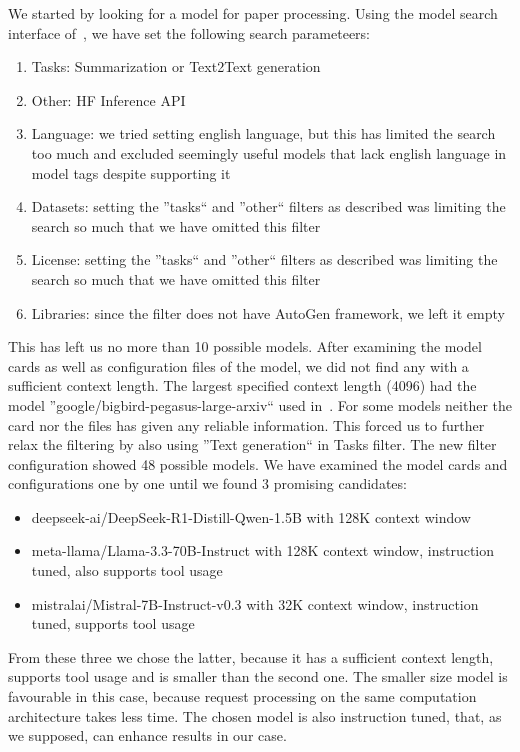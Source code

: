 We started by looking for a model for paper processing. Using the model search interface of~\cite{huggingface}, we have set the following search parameteers: 

\begin{enumerate}
	\item Tasks: Summarization or Text2Text generation
	\item Other: HF Inference API
	\item Language: we tried setting english language, but this has limited the search too much and excluded seemingly useful models that lack english language in model tags despite supporting it
	\item Datasets: setting the ''tasks`` and ''other`` filters as described was limiting the search so much that we have omitted this filter
	\item License: setting the ''tasks`` and ''other`` filters as described was limiting the search so much that we have omitted this filter
	\item Libraries: since the filter does not have AutoGen framework, we left it empty
\end{enumerate}

This has left us no more than 10 possible models. After examining the model cards as well as configuration files of the model, we did not find any with a sufficient context length. The largest specified context length (4096) had the model ''google/bigbird-pegasus-large-arxiv`` used in~\cite{zaheer2021big}. For some models neither the card nor the files has given any reliable information. This forced us to further relax the filtering by also using ''Text generation`` in Tasks filter. The new filter configuration showed 48 possible models. We have examined the model cards and configurations one by one until we found 3 promising candidates:

\begin{itemize}
	\item deepseek-ai/DeepSeek-R1-Distill-Qwen-1.5B with 128K context window
	\item meta-llama/Llama-3.3-70B-Instruct with 128K context window, instruction tuned, also supports tool usage
	\item mistralai/Mistral-7B-Instruct-v0.3 with 32K context window, instruction tuned, supports tool usage
\end{itemize}

From these three we chose the latter, because it has a sufficient context length, supports tool usage and is smaller than the second one. The smaller size model is favourable in this case, because request processing on the same computation architecture takes less time. The chosen model is also instruction tuned, that, as we supposed, can enhance results in our case.

